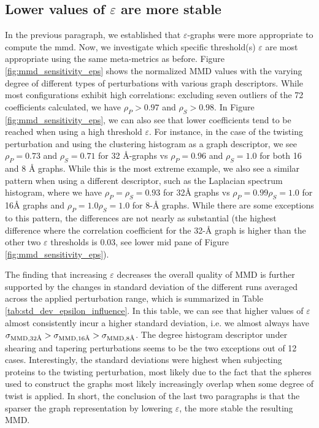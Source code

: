 \subsection{Lower values of $\varepsilon$ are more
  stable}\label{sec:sparser_better}
In the previous paragraph, we established that $\varepsilon$-graphs were more
appropriate to compute the \acrshort{mmd}. Now, we investigate which specific
threshold(s) $\varepsilon$ are most appropriate using the same meta-metrics as
before. Figure \ref{fig:mmd_sensitivity_eps} shows the normalized MMD values
with the varying degree of different types of perturbations with various graph
descriptors. While most configurations exhibit high correlations: excluding
seven outliers of the 72 coefficients calculated, we have $\rho_P>0.97$ and
$\rho_S>0.98$. In Figure \ref{fig:mmd_sensitivity_eps}, we can also see that
lower coefficients tend to be reached when using a high threshold $\varepsilon$.
For instance, in the case of the twisting perturbation and using the clustering
histogram as a graph descriptor, we see $\rho_P=0.73$ and $\rho_S=0.71$ for 32
\si{\angstrom}-graphs vs $\rho_P=0.96$ and $\rho_S=1.0$ for both 16 and 8
\si{\angstrom} graphs. While this is the most extreme example, we also see a
similar pattern when using a different descriptor, such as the Laplacian
spectrum histogram, where we have $\rho_P=\rho_S=0.93$ for 32\si{\angstrom}
graphs vs $\rho_P=0.99 \rho_S=1.0$ for 16\si{\angstrom} graphs and $\rho_P=1.0
\rho_S=1.0$ for 8-\si{\angstrom} graphs. While there are some exceptions to this
pattern, the differences are not nearly as substantial (the highest difference
where the correlation coefficient for the 32-\si{\angstrom} graph is higher than
the other two $\varepsilon$ thresholds is 0.03, see lower mid pane of Figure
\ref{fig:mmd_sensitivity_eps}).

The finding that increasing $\varepsilon$ decreases the overall quality of MMD
is further supported by the changes in standard deviation of the different runs
averaged across the applied perturbation range, which is summarized in Table
\ref{tab:std_dev_epsilon_influence}. In this table, we can see that higher
values of $\varepsilon$ almost consistently incur a higher standard deviation,
i.e. we almost always have $\sigma_{\text{MMD}, 32\si{\angstrom}}>\sigma_{\text{MMD},
  16\si{\angstrom}}>\sigma_{\text{MMD}, 8\si{\angstrom}}$. The degree histogram descriptor under shearing
and tapering perturbations seems to be the two exceptions out of 12 cases.
Interestingly, the standard deviations were highest when subjecting proteins to
the twisting perturbation, most likely due to the fact that the spheres used to
construct the graphs most likely increasingly overlap when some degree of twist
is applied. In short, the conclusion of the last two paragraphs is that the
sparser the graph representation by lowering $\varepsilon$, the more stable the
resulting MMD.


